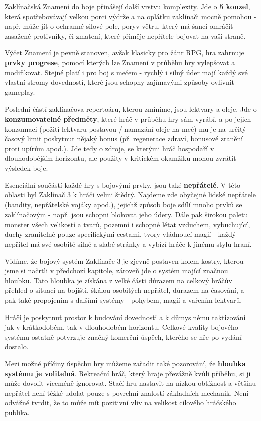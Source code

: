 Zaklínačská Znamení do boje přinášejí další vrstvu komplexity. Jde o \textbf{5 kouzel}, která spotřebovávají velkou porci výdrže a na oplátku zaklínači mocně pomohou - např. může jít o ochranné silové pole, poryv větru, který má šanci omráčit zasažené protivníky, či zmatení, které přiměje nepřítele bojovat na vaší straně.

Výčet Znamení je pevně stanoven, avšak klasicky pro žánr RPG, hra zahrnuje \textbf{prvky progrese}, pomocí kterých lze Znamení v průběhu hry vylepšovat a modifikovat. Stejné platí i pro boj s mečem - rychlý i silný úder mají každý své vlastní stromy dovedností, které jsou schopny zajímavými způsoby ovlivnit gameplay. 

Poslední částí zaklínačova repertoáru, kterou zmíníme, jsou lektvary a oleje. Jde o \textbf{konzumovatelné předměty}, které hráč v průběhu hry sám vyrábí, a po jejich konzumaci (požití lektvaru postavou / namazání oleje na meč) mu je na určitý časový limit poskytnut nějaký bonus (př. regenerace zdraví, bonusové zranění proti upírům apod.). Jde tedy o zdroje, se kterými hráč hospodaří v dlouhodobějším horizontu, ale použity v kritickém okamžiku mohou zvrátit výsledek boje. 

Esenciální součástí každé hry s bojovými prvky, jsou také \textbf{nepřátelé}. V této oblasti byl Zaklínač 3 k hráči velmi štědrý. Najdeme zde obyčejné lidské nepřátele (bandity, nepřátelské vojáky apod.), jejichž způsob boje sdílí mnoho prvků se zaklínačovým - např. jsou schopni blokovat jeho údery. Dále pak širokou paletu monster všech velikostí a tvarů, pozemní i schopné létat vzduchem, vybuchující, duchy zranitelné pouze specifickými cestami, tvory vládnoucí magií - každý nepřítel má své osobité silné a slabé stránky a vybízí hráče k jinému stylu hraní.

\bigbreak

Vidíme, že bojový systém Zaklínače 3 je zjevně postaven kolem kostry, kterou jsme si načrtli v předchozí kapitole, zároveň jde o systém mající značnou hloubku. Tato hloubka je získána z velké části důrazem na celkový hráčův přehled o situaci na bojišti, škálou osobitých nepřátel, důrazem na časování, a pak také propojením s dalšími systémy - pohybem, magií a vařením lektvarů. 

Hráči je poskytnut prostor k budování dovednosti a k důmyslnému taktizování jak v krátkodobém, tak v dlouhodobém horizontu. Celkové kvality bojového systému ostatně potvrzuje značný komerční úspěch, kterého se hře po vydání dostalo.

Mezi možné příčiny úspěchu hry můžeme zařadit také pozorování, že \textbf{hloubka systému je volitelná}. Rekreační hráč, který hraje převážně kvůli příběhu, si ji může dovolit víceméně ignorovat. Stačí hru nastavit na nízkou obtížnost a většinu nepřátel není těžké udolat pouze s povrchní znalostí základních mechanik. Není odvážné tvrdit, že to může mít pozitivní vliv na velikost cílového hráčského publika. 

